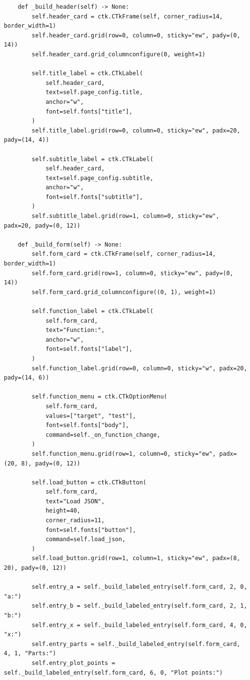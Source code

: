 \documentclass[12pt,a4paper]{article}
\begin{document}
\begin{verbatim}
    def _build_header(self) -> None:
        self.header_card = ctk.CTkFrame(self, corner_radius=14, border_width=1)
        self.header_card.grid(row=0, column=0, sticky="ew", pady=(0, 14))
        self.header_card.grid_columnconfigure(0, weight=1)

        self.title_label = ctk.CTkLabel(
            self.header_card,
            text=self.page_config.title,
            anchor="w",
            font=self.fonts["title"],
        )
        self.title_label.grid(row=0, column=0, sticky="ew", padx=20, pady=(14, 4))

        self.subtitle_label = ctk.CTkLabel(
            self.header_card,
            text=self.page_config.subtitle,
            anchor="w",
            font=self.fonts["subtitle"],
        )
        self.subtitle_label.grid(row=1, column=0, sticky="ew", padx=20, pady=(0, 12))

    def _build_form(self) -> None:
        self.form_card = ctk.CTkFrame(self, corner_radius=14, border_width=1)
        self.form_card.grid(row=1, column=0, sticky="ew", pady=(0, 14))
        self.form_card.grid_columnconfigure((0, 1), weight=1)

        self.function_label = ctk.CTkLabel(
            self.form_card,
            text="Function:",
            anchor="w",
            font=self.fonts["label"],
        )
        self.function_label.grid(row=0, column=0, sticky="w", padx=20, pady=(14, 6))

        self.function_menu = ctk.CTkOptionMenu(
            self.form_card,
            values=["target", "test"],
            font=self.fonts["body"],
            command=self._on_function_change,
        )
        self.function_menu.grid(row=1, column=0, sticky="ew", padx=(20, 8), pady=(0, 12))

        self.load_button = ctk.CTkButton(
            self.form_card,
            text="Load JSON",
            height=40,
            corner_radius=11,
            font=self.fonts["button"],
            command=self.load_json,
        )
        self.load_button.grid(row=1, column=1, sticky="ew", padx=(8, 20), pady=(0, 12))

        self.entry_a = self._build_labeled_entry(self.form_card, 2, 0, "a:")
        self.entry_b = self._build_labeled_entry(self.form_card, 2, 1, "b:")
        self.entry_x = self._build_labeled_entry(self.form_card, 4, 0, "x:")
        self.entry_parts = self._build_labeled_entry(self.form_card, 4, 1, "Parts:")
        self.entry_plot_points = self._build_labeled_entry(self.form_card, 6, 0, "Plot points:")


\end{verbatim}
\end{document}
